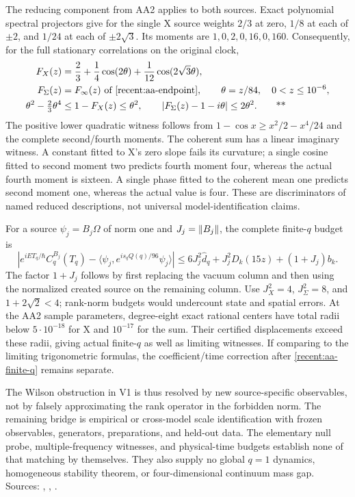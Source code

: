 The reducing component from AA2 applies to both sources.  Exact polynomial
spectral projectors give for the single X source weights $2/3$ at zero,
$1/8$ at each of $\pm2$, and $1/24$ at each of $\pm2\sqrt3$.
Its moments are $1,0,2,0,16,0,160$.  Consequently, for the full stationary
correlations on the original clock,
\begin{align}
 F_X(z)&=\frac23+\frac14\cos(2\theta)
                   +\frac1{12}\cos(2\sqrt3\theta),\notag\\
 F_\Sigma(z)&=F_\infty(z)\text{ of \eqref{recent:aa-endpoint}},
 \qquad\theta=z/84,\quad0<z\le10^{-6},\notag\\
 \theta^2-\tfrac23\theta^4&\le1-F_X(z)\le\theta^2,\qquad
 |F_\Sigma(z)-1-i\theta|\le2\theta^2.\qquad\text{**}
 \label{recent:wilson-endpoints}
\end{align}
The positive lower quadratic witness follows from
$1-\cos x\ge x^2/2-x^4/24$ and the complete second/fourth moments.  The coherent
sum has a linear imaginary witness.  A constant fitted to X's zero slope fails
its curvature; a single cosine fitted to second moment two predicts fourth
moment four, whereas the actual fourth moment is sixteen.  A single phase fitted
to the coherent mean one predicts second moment one, whereas the actual value
is four.  These are discriminators of named reduced descriptions, not universal
model-identification claims.

For a source $\psi_j=B_j\Omega$ of norm one and $J_j=\left\lVert B_j\right\rVert$, the complete
finite-$q$ budget is
\begin{equation}
 \left|e^{iET_q/\hbar}C_q^{B_j}(T_q)
 -\langle\psi_j,e^{is_qQ(q)/96}\psi_j\rangle\right|
 \le6J_j^2\widehat d_q+J_j^2D_k(15z)+(1+J_j)b_k.
 \label{recent:wilson-finite-q}
\end{equation}
The factor $1+J_j$ follows by first replacing the vacuum column and then using
the normalized created source on the remaining column.  Use $J_X^2=4$,
$J_\Sigma^2=8$, and $1+2\sqrt2<4$; rank-norm budgets would undercount state
and spatial errors.  At the AA2 sample parameters, degree-eight exact rational
centers have total radii below $5\cdot10^{-18}$ for X and $10^{-17}$ for the
sum.  Their certified displacements exceed these radii, giving actual finite-$q$
as well as limiting witnesses.  If comparing to the limiting trigonometric
formulas, the coefficient/time correction after \eqref{recent:aa-finite-q}
remains separate.

The Wilson obstruction in V1 is thus resolved by new source-specific observables,
not by falsely approximating the rank operator in the forbidden norm.  The
remaining bridge is empirical or cross-model scale identification with frozen
observables, generators, preparations, and held-out data.  The elementary null
probe, multiple-frequency witnesses, and physical-time budgets establish none
of that matching by themselves.  They also supply no global $q=1$ dynamics,
homogeneous stability theorem, or four-dimensional continuum mass gap.
Sources: ,
,
.
